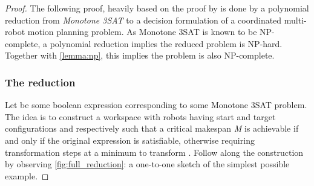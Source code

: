\begin{proof}
	The following proof, heavily based on the proof by \cite{siamcomp/DemaineFKMS19} is done by a polynomial reduction from \emph{Monotone 3SAT} to a decision formulation of a coordinated multi-robot motion planning problem. As Monotone 3SAT is known to be NP-complete, a polynomial reduction implies the reduced problem is NP-hard. Together with \cref{lemma:np}, this implies the problem is also NP-complete. 

	\subsubsection*{The reduction} 
	Let \ilmath{\varphi} be some boolean expression corresponding to some Monotone 3SAT problem. The idea is to construct a workspace with robots having start and target configurations  and  respectively such that a critical makespan \emph{M} is achievable if and only if the original expression \ilmath{\varphi} is satisfiable, otherwise requiring  transformation steps at a minimum to transform . Follow along the construction by observing \cref{fig:full_reduction}: a one-to-one sketch of the simplest possible example. 


\end{proof}
